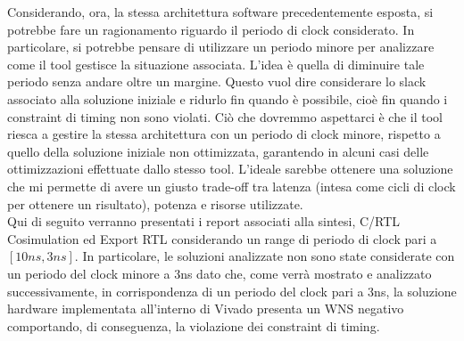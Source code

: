 Considerando, ora, la stessa architettura software precedentemente esposta, si potrebbe fare un ragionamento riguardo il periodo di clock considerato. In particolare, si potrebbe pensare di utilizzare un periodo minore per analizzare come il tool gestisce la situazione associata. L'idea è quella di diminuire tale periodo senza andare oltre un margine. Questo vuol dire considerare lo slack associato alla soluzione iniziale e ridurlo fin quando è possibile, cioè fin quando i constraint di timing non sono violati. Ciò che dovremmo aspettarci è che il tool riesca a gestire la stessa architettura con un periodo di clock minore, rispetto a quello della soluzione iniziale non ottimizzata, garantendo in alcuni casi delle ottimizzazioni effettuate dallo stesso tool. L'ideale sarebbe ottenere una soluzione che mi permette di avere un giusto trade-off tra latenza (intesa come cicli di clock per ottenere un risultato), potenza e risorse utilizzate.
\\
Qui di seguito verranno presentati i report associati alla sintesi, C/RTL Cosimulation ed Export RTL considerando un range di periodo di clock pari a $[10ns, 3ns]$. In particolare, le soluzioni analizzate non sono state considerate con un periodo del clock minore a 3ns dato che, come verrà mostrato e analizzato successivamente, in corrispondenza di un periodo del clock pari a 3ns, la soluzione hardware implementata all'interno di Vivado presenta un WNS negativo comportando, di conseguenza, la violazione dei constraint di timing.
